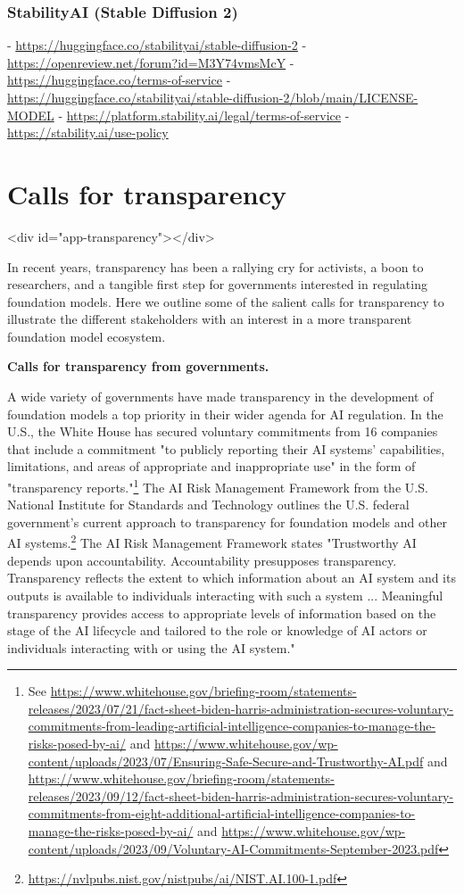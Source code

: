 \documentclass[screen, authorversion, acmsmall]{acmart}
\begin{document}
\subsubsection{StabilityAI (Stable Diffusion 2)}
-  \url{https://huggingface.co/stabilityai/stable-diffusion-2}
-  \url{https://openreview.net/forum?id=M3Y74vmsMcY}
-  \url{https://huggingface.co/terms-of-service}
-  \url{https://huggingface.co/stabilityai/stable-diffusion-2/blob/main/LICENSE-MODEL}
-  \url{https://platform.stability.ai/legal/terms-of-service}
-  \url{https://stability.ai/use-policy}
\clearpage
\hypertarget{transparency-app}{\section{Calls for transparency}}
<div id="app-transparency"></div>


In recent years, transparency has been a rallying cry for activists, a boon to researchers, and a tangible first step for governments interested in regulating foundation models. Here we outline some of the salient calls for transparency to illustrate the different stakeholders with an interest in a more transparent foundation model ecosystem.

\textbf{Calls for transparency from governments.}

A wide variety of governments have made transparency in the development of foundation models a top priority in their wider agenda for AI regulation. 
In the U.S., the White House has secured voluntary commitments from 16 companies that include a commitment "to publicly reporting their AI systems’ capabilities, limitations, and areas of appropriate and inappropriate use" in the form of "transparency reports."\footnote{See \url{https://www.whitehouse.gov/briefing-room/statements-releases/2023/07/21/fact-sheet-biden-harris-administration-secures-voluntary-commitments-from-leading-artificial-intelligence-companies-to-manage-the-risks-posed-by-ai/} and \url{https://www.whitehouse.gov/wp-content/uploads/2023/07/Ensuring-Safe-Secure-and-Trustworthy-AI.pdf} and \url{https://www.whitehouse.gov/briefing-room/statements-releases/2023/09/12/fact-sheet-biden-harris-administration-secures-voluntary-commitments-from-eight-additional-artificial-intelligence-companies-to-manage-the-risks-posed-by-ai/} and \url{https://www.whitehouse.gov/wp-content/uploads/2023/09/Voluntary-AI-Commitments-September-2023.pdf}} 
The AI Risk Management Framework from the U.S. National Institute for Standards and Technology outlines the U.S. federal government’s current approach to transparency for foundation models and other AI systems.\footnote{\url{https://nvlpubs.nist.gov/nistpubs/ai/NIST.AI.100-1.pdf}}
The AI Risk Management Framework states "Trustworthy AI depends upon accountability. Accountability presupposes transparency. Transparency reflects the extent to which information about an AI system and its outputs is available to individuals interacting with such a system ... Meaningful transparency provides access to appropriate levels of information based on the stage of the AI lifecycle and tailored to the role or knowledge of AI actors or individuals interacting with or using the AI system." 
\end{document}
